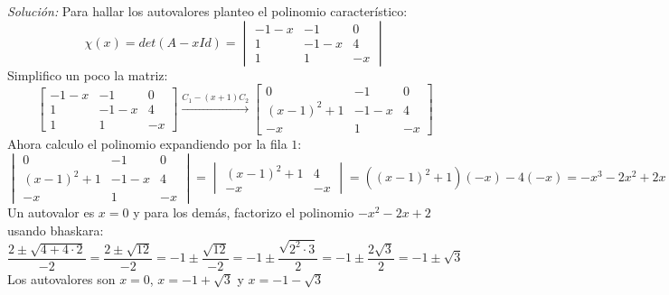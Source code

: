 \documentclass{article}
\newenvironment{solution}
    {\textit{Solución:}}
    {}
\begin{document}
\begin{solution}
Para hallar los autovalores planteo el polinomio característico:
\[
\chi (x) = det(A-xId) = 
\begin{vmatrix}
-1-x & -1 & 0 \\
1 & -1-x & 4 \\
1 & 1 & -x
\end{vmatrix}
\]
Simplifico un poco la matriz:
\[
\begin{bmatrix}
-1-x & -1 & 0 \\
1 & -1-x & 4 \\
1 & 1 & -x
\end{bmatrix} \xrightarrow{C_1-(x+1)C_2}
\begin{bmatrix}
0 & -1 & 0 \\
(x-1)^2+1 & -1-x & 4 \\
-x & 1 & -x
\end{bmatrix}
\]
Ahora calculo el polinomio expandiendo por la fila $1$:
\[
\begin{vmatrix}
0 & -1 & 0 \\
(x-1)^2+1 & -1-x & 4 \\
-x & 1 & -x
\end{vmatrix} = 
\begin{vmatrix}
(x-1)^2+1 & 4 \\
-x & -x
\end{vmatrix} = ((x-1)^2+1)(-x)-4(-x)= -x^3-2x^2+2x = x (-x^2-2x+2)
\]
Un autovalor es $x=0$ y para los demás, factorizo el polinomio $-x^2-2x+2$ usando bhaskara:
\[
\frac{2\pm \sqrt{4+4\cdot2}}{-2} = \frac{2\pm \sqrt{12}}{-2} = -1 \pm \frac{\sqrt{12}}{-2} = -1 \pm \frac{\sqrt{2^2\cdot 3}}{2} = -1 \pm \frac{2\sqrt{3}}{2} = -1 \pm \sqrt{3}
\]
Los autovalores son $x=0$, $x = -1+\sqrt{3}$ y $x=-1-\sqrt{3}$
\end{solution}
\end{document}
